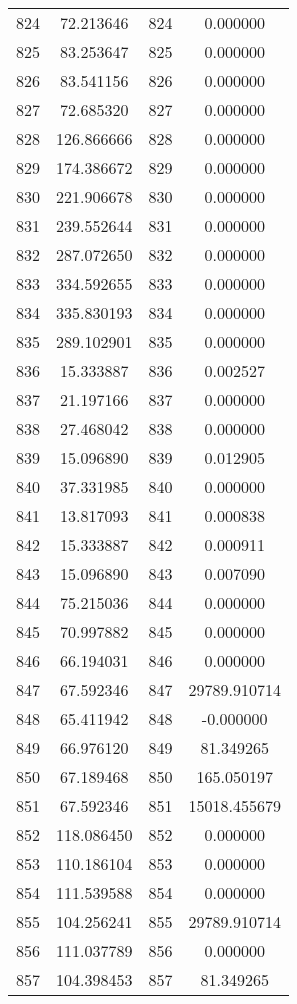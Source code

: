 \documentclass[12pt]{article}
\begin{document}
\begin{longtable}{@{}cccc@{}}
824 & 72.213646 & 824 & 0.000000 \\
825 & 83.253647 & 825 & 0.000000 \\
826 & 83.541156 & 826 & 0.000000 \\
827 & 72.685320 & 827 & 0.000000 \\
828 & 126.866666 & 828 & 0.000000 \\
829 & 174.386672 & 829 & 0.000000 \\
830 & 221.906678 & 830 & 0.000000 \\
831 & 239.552644 & 831 & 0.000000 \\
832 & 287.072650 & 832 & 0.000000 \\
833 & 334.592655 & 833 & 0.000000 \\
834 & 335.830193 & 834 & 0.000000 \\
835 & 289.102901 & 835 & 0.000000 \\
836 & 15.333887 & 836 & 0.002527 \\
837 & 21.197166 & 837 & 0.000000 \\
838 & 27.468042 & 838 & 0.000000 \\
839 & 15.096890 & 839 & 0.012905 \\
840 & 37.331985 & 840 & 0.000000 \\
841 & 13.817093 & 841 & 0.000838 \\
842 & 15.333887 & 842 & 0.000911 \\
843 & 15.096890 & 843 & 0.007090 \\
844 & 75.215036 & 844 & 0.000000 \\
845 & 70.997882 & 845 & 0.000000 \\
846 & 66.194031 & 846 & 0.000000 \\
847 & 67.592346 & 847 & 29789.910714 \\
848 & 65.411942 & 848 & -0.000000 \\
849 & 66.976120 & 849 & 81.349265 \\
850 & 67.189468 & 850 & 165.050197 \\
851 & 67.592346 & 851 & 15018.455679 \\
852 & 118.086450 & 852 & 0.000000 \\
853 & 110.186104 & 853 & 0.000000 \\
854 & 111.539588 & 854 & 0.000000 \\
855 & 104.256241 & 855 & 29789.910714 \\
856 & 111.037789 & 856 & 0.000000 \\
857 & 104.398453 & 857 & 81.349265 \\

\end{longtable}
\end{document}
